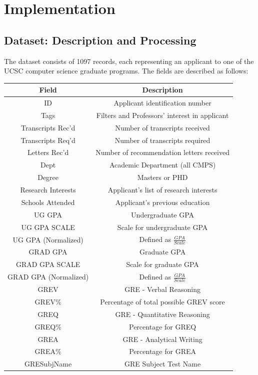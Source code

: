 \documentclass[]{article}
\begin{document}
\section{Implementation}
	\subsection{Dataset: Description and Processing}
		The dataset consists of 1097 records, each representing an applicant to one of the UCSC computer science graduate programs. The fields are described as follows:
		
		\begin{tabular}{c|c}
		 Field & Description \\ \hline
		 ID & Applicant identification number \\
		 Tags & Filters and Professors' interest in applicant\\
		 Transcripts Rec'd & Number of transcripts received \\ 
		 Transcripts Req'd & Number of transcripts required \\
		 Letters Rec'd & Number of recommendation letters received\\
		 Dept & Academic Department (all CMPS)\\
		 Degree & Masters or PHD\\
		 Research Interests & Applicant's list of research interests\\
		 Schools Attended & Applicant's previous education\\
		 UG GPA & Undergraduate GPA\\
		 UG GPA SCALE & Scale for undergraduate GPA\\ 
		 UG GPA (Normalized) & Defined as $\frac{GPA}{Scale}$\\ 
		 GRAD GPA & Graduate GPA\\
		 GRAD GPA SCALE & Scale for graduate GPA\\
		 GRAD GPA (Normalized) &  Defined as $\frac{GPA}{Scale}$\\
		 GREV & GRE - Verbal Reasoning\\
		 GREV\% & Percentage of total possible GREV score\\
		 GREQ & GRE - Quantitative Reasoning\\
		 GREQ\% & Percentage for GREQ\\
		 GREA & GRE - Analytical Writing\\
		 GREA\% & Percentage for GREA\\
		 GRESubjName & GRE Subject Test Name \\ 

\end{tabular}
\end{document}
